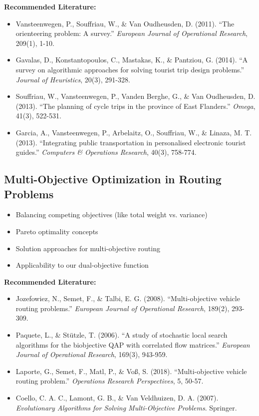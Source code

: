 \noindent\textbf{Recommended Literature:}
\begin{itemize}
    \item Vansteenwegen, P., Souffriau, W., \& Van Oudheusden, D. (2011). ``The orienteering problem: A survey.'' \textit{European Journal of Operational Research}, 209(1), 1-10.
    \item Gavalas, D., Konstantopoulos, C., Mastakas, K., \& Pantziou, G. (2014). ``A survey on algorithmic approaches for solving tourist trip design problems.'' \textit{Journal of Heuristics}, 20(3), 291-328.
    \item Souffriau, W., Vansteenwegen, P., Vanden Berghe, G., \& Van Oudheusden, D. (2013). ``The planning of cycle trips in the province of East Flanders.'' \textit{Omega}, 41(3), 522-531.
    \item Garcia, A., Vansteenwegen, P., Arbelaitz, O., Souffriau, W., \& Linaza, M. T. (2013). ``Integrating public transportation in personalised electronic tourist guides.'' \textit{Computers \& Operations Research}, 40(3), 758-774.
\end{itemize}

\subsection{Multi-Objective Optimization in Routing Problems}
\begin{itemize}
    \item Balancing competing objectives (like total weight vs. variance)
    \item Pareto optimality concepts
    \item Solution approaches for multi-objective routing
    \item Applicability to our dual-objective function
\end{itemize}

\noindent\textbf{Recommended Literature:}
\begin{itemize}
    \item Jozefowiez, N., Semet, F., \& Talbi, E. G. (2008). ``Multi-objective vehicle routing problems.'' \textit{European Journal of Operational Research}, 189(2), 293-309.
    \item Paquete, L., \& Stützle, T. (2006). ``A study of stochastic local search algorithms for the biobjective QAP with correlated flow matrices.'' \textit{European Journal of Operational Research}, 169(3), 943-959.
    \item Laporte, G., Semet, F., Matl, P., \& Voß, S. (2018). ``Multi-objective vehicle routing problem.'' \textit{Operations Research Perspectives}, 5, 50-57.
    \item Coello, C. A. C., Lamont, G. B., \& Van Veldhuizen, D. A. (2007). \textit{Evolutionary Algorithms for Solving Multi-Objective Problems}. Springer.
\end{itemize}

